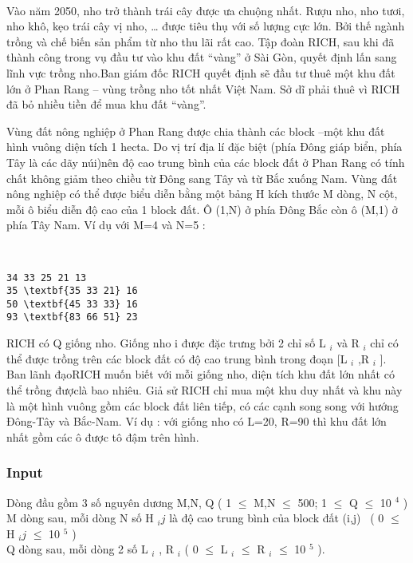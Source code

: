 

 

Vào năm 2050, nho trở thành trái cây được ưa chuộng nhất. Rượu nho, nho tươi, nho khô, kẹo trái cây vị nho, … được tiêu thụ với số lượng cực lớn. Bởi thế ngành trồng và chế biến sản phẩm từ nho thu lãi rất cao. Tập đoàn RICH, sau khi đã thành công trong vụ đầu tư vào khu đất “vàng” ở Sài Gòn, quyết định lấn sang lĩnh vực trồng nho.Ban giám đốc RICH quyết định sẽ đầu tư thuê một khu đất lớn ở Phan Rang – vùng trồng nho tốt nhất Việt Nam. Sở dĩ phải thuê vì RICH đã bỏ nhiều tiền để mua khu đất “vàng”.

Vùng đất nông nghiệp ở Phan Rang được chia thành các block –một khu đất hình vuông diện tích 1 hecta. Do vị trí địa lí đặc biệt (phía Đông giáp biển, phía Tây là các dãy núi)nên độ cao trung bình của các block đất ở Phan Rang có tính chất không giảm theo chiều từ Đông sang Tây và từ Bắc xuống Nam. Vùng đất nông nghiệp có thể được biểu diễn bằng một bảng H kích thước M dòng, N cột, mỗi ô biểu diễn độ cao của 1 block đất. Ô (1,N) ở phía Đông Bắc còn ô (M,1) ở phía Tây Nam. Ví dụ với M=4 và N=5 :

 
\begin{verbatim}
34 33 25 21 13
35 \textbf{35 33 21} 16
50 \textbf{45 33 33} 16
93 \textbf{83 66 51} 23

\end{verbatim}

RICH có Q giống nho. Giống nho i được đặc trưng bởi 2 chỉ số L $_ i $ và R $_ i $ chỉ có thể được trồng trên các block đất có độ cao trung bình trong đoạn [L $_ i $ ,R $_ i $ ]. Ban lãnh đạoRICH muốn biết với mỗi giống nho, diện tích khu đất lớn nhất có thể trồng đượclà bao nhiêu. Giả sử RICH chỉ mua một khu duy nhất và khu này là một hình vuông gồm các block đất liên tiếp, có các cạnh song song với hướng Đông-Tây và Bắc-Nam. Ví dụ : với giống nho có L=20, R=90 thì khu đất lớn nhất gồm các ô được tô đậm trên hình.

\subsubsection{Input}

Dòng đầu gồm 3 số nguyên dương M,N, Q ( 1  $\le$  M,N  $\le$  500; 1  $\le$  Q  $\le$  10 $^ 4 $ )
\\M dòng sau, mỗi dòng N số H $_ ij $ là độ cao trung bình của block đất (i,j)  ( 0  $\le$  H $_ ij $  $\le$  10 $^ 5 $ )
\\Q dòng sau, mỗi dòng 2 số L $_ i $ , R $_ i $ ( 0  $\le$  L $_ i $  $\le$  R $_ i $  $\le$  10 $^ 5 $ ).

